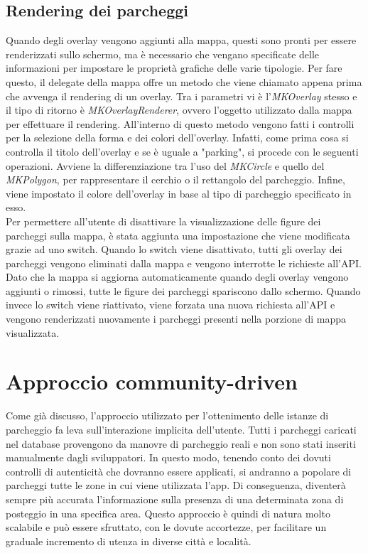 \subsection{Rendering dei parcheggi}

Quando degli overlay vengono aggiunti alla mappa, questi sono pronti per essere
renderizzati sullo schermo, ma è necessario che vengano specificate delle informazioni
per impostare le proprietà grafiche delle varie tipologie. Per fare questo, il delegate
della mappa offre un metodo che viene chiamato appena prima che avvenga il rendering
di un overlay. Tra i parametri vi è l'\emph{MKOverlay} stesso e il tipo di ritorno
è \emph{MKOverlayRenderer}, ovvero l'oggetto utilizzato dalla mappa per effettuare 
il rendering. All'interno di questo metodo vengono fatti i controlli per la selezione
della forma e dei colori dell'overlay. Infatti, come prima cosa si controlla il titolo
dell'overlay e se è uguale a "parking", si procede con le seguenti operazioni. Avviene
la differenziazione tra l'uso del \emph{MKCircle} e quello del \emph{MKPolygon}, per 
rappresentare il cerchio o il rettangolo del parcheggio. Infine, viene impostato
il colore dell'overlay in base al tipo di parcheggio specificato in esso.\\
Per permettere all'utente di disattivare la visualizzazione delle figure dei parcheggi
sulla mappa, è stata aggiunta una impostazione che viene modificata grazie ad uno switch.
Quando lo switch viene disattivato, tutti gli overlay dei parcheggi vengono eliminati 
dalla mappa e vengono interrotte le richieste all'API. Dato che la mappa si aggiorna 
automaticamente quando degli overlay vengono aggiunti o rimossi, tutte le figure 
dei parcheggi spariscono dallo schermo. Quando invece lo switch viene riattivato,
viene forzata una nuova richiesta all'API e vengono renderizzati nuovamente i parcheggi
presenti nella porzione di mappa visualizzata.

\section{Approccio community-driven}

Come già discusso, l'approccio utilizzato per l'ottenimento delle istanze di parcheggio
fa leva sull'interazione implicita dell'utente. Tutti i parcheggi caricati nel database
provengono da manovre di parcheggio reali e non sono stati inseriti manualmente dagli
sviluppatori. In questo modo, tenendo conto dei dovuti controlli di autenticità che 
dovranno essere applicati, si andranno a popolare di parcheggi tutte le zone in cui 
viene utilizzata l'app. Di conseguenza, diventerà sempre più accurata l'informazione
sulla presenza di una determinata zona di posteggio in una specifica area. Questo 
approccio è quindi di natura molto scalabile e può essere sfruttato, con le dovute
accortezze, per facilitare un graduale incremento di utenza in diverse città e 
località.

